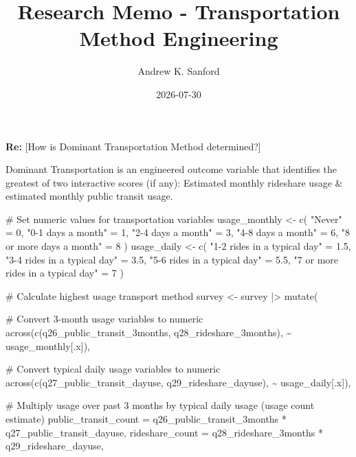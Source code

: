 \documentclass[
  11pt,
  letterpaper,
]{article}
\title{Research Memo - Transportation Method Engineering}
\author{Andrew K. Sanford}
\date{2026-07-30}
\newenvironment{Shaded}{\begin{snugshade}}{\end{snugshade}}
\newcommand{\AttributeTok}[1]{\textcolor[rgb]{0.40,0.45,0.13}{#1}}
\newcommand{\CommentTok}[1]{\textcolor[rgb]{0.37,0.37,0.37}{#1}}
\newcommand{\DecValTok}[1]{\textcolor[rgb]{0.68,0.00,0.00}{#1}}
\newcommand{\FloatTok}[1]{\textcolor[rgb]{0.68,0.00,0.00}{#1}}
\newcommand{\FunctionTok}[1]{\textcolor[rgb]{0.28,0.35,0.67}{#1}}
\newcommand{\NormalTok}[1]{\textcolor[rgb]{0.00,0.23,0.31}{#1}}
\newcommand{\OtherTok}[1]{\textcolor[rgb]{0.00,0.23,0.31}{#1}}
\newcommand{\SpecialCharTok}[1]{\textcolor[rgb]{0.37,0.37,0.37}{#1}}
\newcommand{\StringTok}[1]{\textcolor[rgb]{0.13,0.47,0.30}{#1}}
\begin{document}
\maketitle


\textbf{Re:} {[}How is Dominant Transportation Method determined?{]}

Dominant Transportation is an engineered outcome variable that
identifies the greatest of two interactive scores (if any): Estimated
monthly rideshare usage \& estimated monthly public transit usage.

\begin{Shaded}
\begin{Highlighting}[]
\CommentTok{\# Set numeric values for transportation variables}
\NormalTok{usage\_monthly }\OtherTok{\textless{}{-}} \FunctionTok{c}\NormalTok{(}
  \StringTok{"Never"}                     \OtherTok{=} \DecValTok{0}\NormalTok{,}
  \StringTok{"0{-}1 days a month"}          \OtherTok{=} \DecValTok{1}\NormalTok{,}
  \StringTok{"2{-}4 days a month"}          \OtherTok{=} \DecValTok{3}\NormalTok{,}
  \StringTok{"4{-}8 days a month"}          \OtherTok{=} \DecValTok{6}\NormalTok{,}
  \StringTok{"8 or more days a month"}    \OtherTok{=} \DecValTok{8}
\NormalTok{  )}
\NormalTok{usage\_daily }\OtherTok{\textless{}{-}} \FunctionTok{c}\NormalTok{(}
  \StringTok{"1{-}2 rides in a typical day"}       \OtherTok{=} \FloatTok{1.5}\NormalTok{,}
  \StringTok{"3{-}4 rides in a typical day"}       \OtherTok{=} \FloatTok{3.5}\NormalTok{,}
  \StringTok{"5{-}6 rides in a typical day"}       \OtherTok{=} \FloatTok{5.5}\NormalTok{,}
  \StringTok{"7 or more rides in a typical day"} \OtherTok{=} \DecValTok{7}
\NormalTok{  )}

\CommentTok{\# Calculate highest usage transport method}
\NormalTok{survey }\OtherTok{\textless{}{-}}\NormalTok{ survey }\SpecialCharTok{|\textgreater{}}
  \FunctionTok{mutate}\NormalTok{(}
    
\CommentTok{\#   Convert 3{-}month usage variables to numeric}
    \FunctionTok{across}\NormalTok{(}\FunctionTok{c}\NormalTok{(q26\_public\_transit\_3months, q28\_rideshare\_3months), }\SpecialCharTok{\textasciitilde{}}\NormalTok{ usage\_monthly[.x]),}
    
\CommentTok{\#   Convert typical daily usage variables to numeric}
    \FunctionTok{across}\NormalTok{(}\FunctionTok{c}\NormalTok{(q27\_public\_transit\_dayuse, q29\_rideshare\_dayuse), }\SpecialCharTok{\textasciitilde{}}\NormalTok{ usage\_daily[.x]),}

\CommentTok{\#   Multiply usage over past 3 months by typical daily usage (usage count estimate)}
    \AttributeTok{public\_transit\_count =}\NormalTok{ q26\_public\_transit\_3months }\SpecialCharTok{*}\NormalTok{ q27\_public\_transit\_dayuse,}
    \AttributeTok{rideshare\_count =}\NormalTok{ q28\_rideshare\_3months }\SpecialCharTok{*}\NormalTok{ q29\_rideshare\_dayuse,}


\end{Highlighting}
\end{Shaded}
\end{document}
